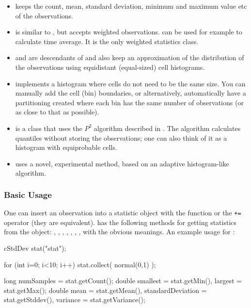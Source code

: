 \begin{itemize}
  \item{ keeps the count, mean, standard
    deviation, minimum and maximum value etc of the observations.}
  \item{ is similar to , but
    accepts weighted observations.  can be used
    for example to calculate time average. It is the only weighted
    statistics class.}
  \item{ and  are
    descendants of  and also keep an approximation of
    the distribution of the observations using equidistant
    (equal-sized) cell histograms.}
  \item{ implements a histogram where cells do not
    need to be the same size. You can manually add the cell (bin)
    boundaries, or alternatively, automatically have a partitioning
    created where each bin has the same number of observations (or as
    close to that as possible).}
  \item{ is a class that uses the $P^{2}$ algorithm
    described in \cite{JCh85}. The algorithm calculates quantiles without
    storing the observations; one can also think of it as a histogram
    with equiprobable cells.}
  \item{ uses a novel, experimental method, based on an
    adaptive histogram-like algorithm.}
\end{itemize}

\subsubsection{Basic Usage}

One can insert an observation into a statistic object with the
 function or the \texttt{+=} operator (they are
equivalent).   has the following methods for getting
statistics from the object: , ,
, , , ,
,  with the obvious meanings. An example
usage for :

\begin{cpp}
cStdDev stat("stat");

for (int i=0; i<10; i++)
  stat.collect( normal(0,1) );

long numSamples = stat.getCount();
double smallest = stat.getMin(),
       largest = stat.getMax();
double mean = stat.getMean(),
       standardDeviation = stat.getStddev(),
       variance = stat.getVariance();
\end{cpp}





